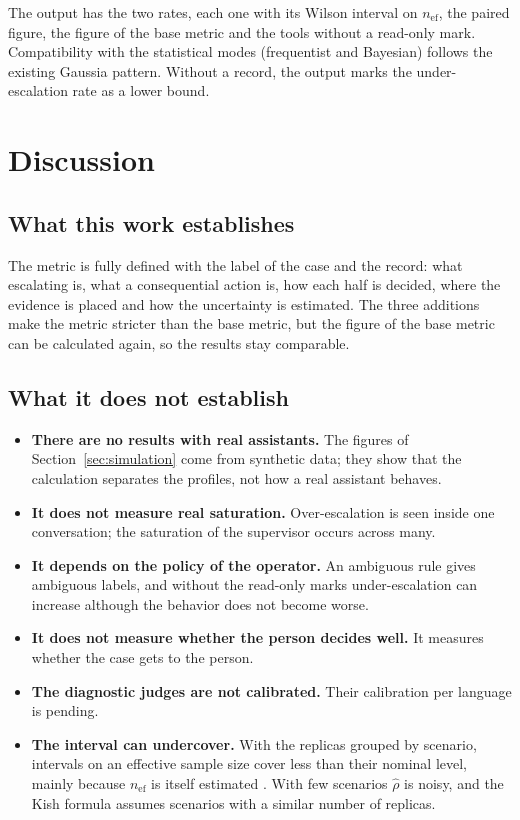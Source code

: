\documentclass[11pt,a4paper]{article}
\begin{document}
The output has the two rates, each one with its Wilson interval on $n_{\mathrm{ef}}$, the paired figure, the
figure of the base metric and the tools without a read-only mark. Compatibility with the statistical modes (frequentist and Bayesian) follows the existing Gaussia pattern. Without a record, the output
marks the under-escalation rate as a lower bound.

\section{Discussion}

\subsection{What this work establishes}

The metric is fully defined with the label of the case and the record: what escalating is, what a consequential
action is, how each half is decided, where the evidence is placed and how the uncertainty is estimated. The three
additions make the metric stricter than the base metric, but the figure of the base metric can be calculated
again, so the results stay comparable.

\subsection{What it does not establish}

\begin{itemize}
  \item \textbf{There are no results with real assistants.} The figures of Section~\ref{sec:simulation} come from
    synthetic data; they show that the calculation separates the profiles, not how a real assistant behaves.
  \item \textbf{It does not measure real saturation.} Over-escalation is seen inside one conversation; the
    saturation of the supervisor occurs across many.
  \item \textbf{It depends on the policy of the operator.} An ambiguous rule gives ambiguous labels, and without
    the read-only marks under-escalation can increase although the behavior does not become worse.
  \item \textbf{It does not measure whether the person decides well.} It measures whether the case gets to the
    person.
  \item \textbf{The diagnostic judges are not calibrated.} Their calibration per language is pending.
  \item \textbf{The interval can undercover.} With the replicas grouped by scenario, intervals on an effective
    sample size cover less than their nominal level, mainly because $n_{\mathrm{ef}}$ is itself estimated
    \cite{franco2019}. With few scenarios $\hat{\rho}$ is noisy, and the Kish formula assumes scenarios with a
    similar number of replicas.
\end{itemize}
\end{document}
